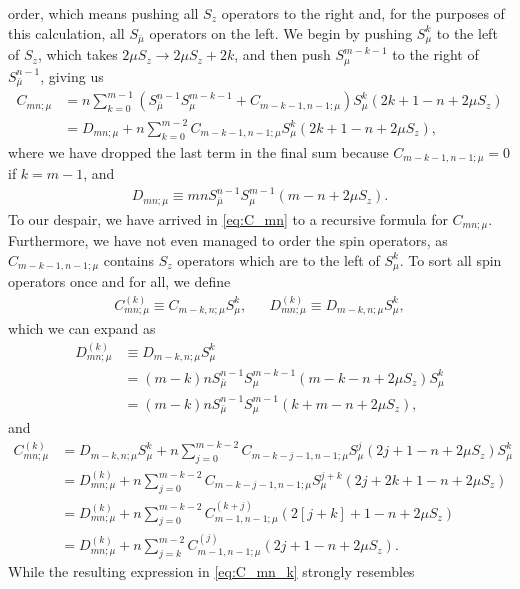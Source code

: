 \documentclass[aps,notitlepage,nofootinbib,11pt]{revtex4-1}
\newcommand{\p}[1]{\left(#1\right)} %
\renewcommand{\sp}[1]{\left[#1\right]} %
\newcommand{\bmu}{{\bar\mu}}
\newcommand{\1}{\mathds{1}}
\begin{document}
order, which means pushing all $S_z$ operators to the right and, for
the purposes of this calculation, all $S_\bmu$ operators on the left.
We begin by pushing $S_\mu^k$ to the left of $S_z$, which takes
$2\mu S_z\to 2\mu S_z+2k$, and then push $S_\mu^{m-k-1}$ to the right
of $S_\bmu^{n-1}$, giving us
\begin{align}
  C_{mn;\mu}
  &= n \sum_{k=0}^{m-1}
  \p{S_\bmu^{n-1} S_\mu^{m-k-1} + C_{m-k-1,n-1;\mu}} S_\mu^k
  \p{2k + 1 - n + 2\mu S_z} \\
  &= D_{mn;\mu}
  + n \sum_{k=0}^{m-2} C_{m-k-1,n-1;\mu}
  S_\mu^k \p{2k + 1 - n + 2\mu S_z},
  \label{eq:C_mn}
\end{align}
where we have dropped the last term in the final sum because
$C_{m-k-1,n-1;\mu}=0$ if $k=m-1$, and
\begin{align}
  D_{mn;\mu}
  \equiv mn S_\bmu^{n-1} S_\mu^{m-1} \p{m - n + 2\mu S_z}.
  \label{eq:D_mn}
\end{align}
To our despair, we have arrived in \eqref{eq:C_mn} to a recursive
formula for $C_{mn;\mu}$.  Furthermore, we have not even managed to
order the spin operators, as $C_{m-k-1,n-1;\mu}$ contains $S_z$
operators which are to the left of $S_\mu^k$.  To sort all spin
operators once and for all, we define
\begin{align}
  C_{mn;\mu}^{(k)} \equiv C_{m-k,n;\mu} S_\mu^k,
  &&
  D_{mn;\mu}^{(k)} \equiv D_{m-k,n;\mu} S_\mu^k,
\end{align}
which we can expand as
\begin{align}
  D_{mn;\mu}^{(k)}
  &\equiv D_{m-k,n;\mu}S_\mu^k \\
  &= \p{m-k}n S_\bmu^{n-1} S_\mu^{m-k-1}
  \p{m-k-n+2\mu S_z} S_\mu^k \\
  &= \p{m-k}n S_\bmu^{n-1} S_\mu^{m-1} \p{k+m-n+2\mu S_z},
  \label{eq:D_mn_k}
\end{align}
and
\begin{align}
  C_{mn;\mu}^{(k)}
  &= D_{m-k,n;\mu} S_\mu^k + n \sum_{j=0}^{m-k-2}
  C_{m-k-j-1,n-1;\mu} S_\mu^j \p{2j+1-n+2\mu S_z} S_\mu^k \\
  &= D_{mn;\mu}^{(k)} + n \sum_{j=0}^{m-k-2}
  C_{m-k-j-1,n-1;\mu} S_\mu^{j+k} \p{2j+2k+1-n+2\mu S_z} \\
  &= D_{mn;\mu}^{(k)} + n \sum_{j=0}^{m-k-2}
  C_{m-1,n-1;\mu}^{(k+j)} \p{2\sp{j+k}+1-n+2\mu S_z} \\
  &= D_{mn;\mu}^{(k)} + n \sum_{j=k}^{m-2}
  C_{m-1,n-1;\mu}^{(j)} \p{2j+1-n+2\mu S_z}.
  \label{eq:C_mn_k}
\end{align}
While the resulting expression in \eqref{eq:C_mn_k} strongly resembles
\end{document}
